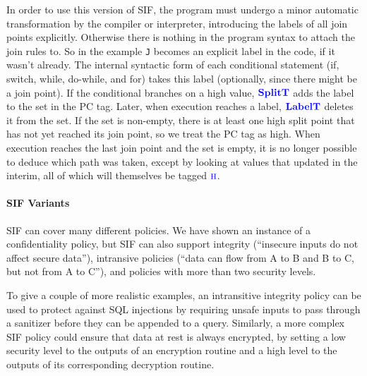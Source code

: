 \documentclass{llncs}
\begin{document}
In order to use this version of SIF, the program must undergo a minor automatic transformation
by the compiler or interpreter, introducing
the labels of all join points explicitly. Otherwise there is nothing in the program
syntax to attach the join rules to. So in the example {\tt J} becomes an explicit label in the code,
if it wasn't already. 
The internal syntactic form of each conditional statement (if, switch, while, do-while, and for)
takes this label (optionally, since there might be a join point).
If the conditional branches on a high value, \(\color{blue} \mathbf{SplitT}\) adds the label to the set
in the PC tag. Later, when execution reaches a label, \(\color{blue} \mathbf{LabelT}\) deletes it from the
set. If the set is non-empty, there is at least one high split point that has not
yet reached its join point, so we treat the PC tag as high. When execution reaches the
last join point and the set is empty, it is no longer possible to deduce which
path was taken, except by looking at values that updated in the interim, all of which
will themselves be tagged \(\textnormal{\color{blue} \sc h}\).

\paragraph*{SIF Variants}

SIF can cover many different policies. We have shown an instance of
a confidentiality policy, but SIF can also support integrity
(``insecure inputs do not affect secure data''), intransive policies
(``data can flow from A to B and B to C, but not from A to C''), and policies with
more than two security levels.

To give a couple of more realistic examples, an intransitive integrity policy
can be used to protect against SQL injections by requiring unsafe inputs to pass through a sanitizer
before they can be appended to a query. Similarly, a more complex SIF policy could ensure that
data at rest is always encrypted, by setting a low security level to the outputs of an encryption
routine and a high level to the outputs of its corresponding decryption routine.
\end{document}

